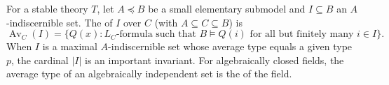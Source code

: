 For a stable theory $T$, let $A \preceq B$ be a small elementary submodel and $I \subseteq B$ an $A$-indiscernible set. The  of $I$ over $C$ (with $A \subseteq C \subseteq B$) is
$$\operatorname{Av}_C(I) = \{Q(x) : L_C\text{-formula such that } B \vDash Q(i) \text{ for all but finitely many } i \in I\}.$$
When $I$ is a maximal $A$-indiscernible set whose average type equals a given type $p$, the cardinal $|I|$ is an important invariant. For algebraically closed fields, the average type of an algebraically independent set is the  of the field.
